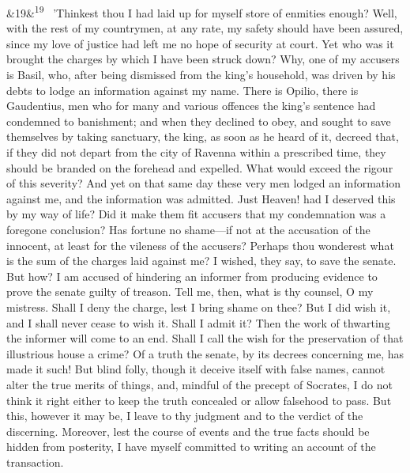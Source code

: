 \documentclass[12pt]{article}
\newcommand{\para}[1][]{\par\noindent\ifx&#1&\else\textsuperscript{\footnotesize #1}~\fi}
\begin{document}
\para[19] 'Thinkest thou I had laid up for myself store of enmities enough? Well, with the rest of my countrymen, at any rate, my safety should have been assured, since my love of justice had left me no hope of security at court. Yet who was it brought the charges by which I have been struck down? Why, one of my accusers is Basil, who, after being dismissed from the king's household, was driven by his debts to lodge an information against my name. There is Opilio, there is Gaudentius, men who for many and various offences the king's sentence had condemned to banishment; and when they declined to obey, and sought to save themselves by taking sanctuary, the king, as soon as he heard of it, decreed that, if they did not depart from the city of Ravenna within a prescribed time, they should be branded on the forehead and expelled. What would exceed the rigour of this severity? And yet on that same day these very men lodged an information against me, and the information was admitted. Just Heaven! had I deserved this by my way of life? Did it make them fit accusers that my condemnation was a foregone conclusion? Has fortune no shame---if not at the accusation of the innocent, at least for the vileness of the accusers? Perhaps thou wonderest what is the sum of the charges laid against me? I wished, they say, to save the senate. But how? I am accused of hindering an informer from producing evidence to prove the senate guilty of treason. Tell me, then, what is thy counsel, O my mistress. Shall I deny the charge, lest I bring shame on thee? But I did wish it, and I shall never cease to wish it. Shall I admit it? Then the work of thwarting the informer will come to an end. Shall I call the wish for the preservation of that illustrious house a crime? Of a truth the senate, by its decrees concerning me, has made it such! But blind folly, though it deceive itself with false names, cannot alter the true merits of things, and, mindful of the precept of Socrates, I do not think it right either to keep the truth concealed or allow falsehood to pass. But this, however it may be, I leave to thy judgment and to the verdict of the discerning. Moreover, lest the course of events and the true facts should be hidden from posterity, I have myself committed to writing an account of the transaction.
\end{document}
